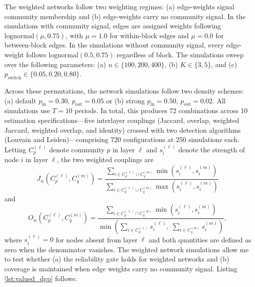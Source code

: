 \documentclass[11pt, letterpaper]{article}
\numberwithin{equation}{section}
\begin{document}
The weighted networks follow two weighting regimes: (a) edge-weights signal community membership and (b) edge-weights carry no community signal. In the simulations with community signal, edges are assigned weights following $\mathrm{lognormal}(\mu, 0.75)$, with $\mu = 1.0$ for within-block edges and $\mu = 0.0$ for between-block edges. In the simulations without community signal, every edge-weight follows $\mathrm{lognormal}(0.5, 0.75)$ regardless of block. The simulations sweep over the following parameters: (a) $n \in \{100, 200, 400\}$, (b) $K \in \{3, 5\}$, and (c) $p_{\mathrm{switch}} \in \{0.05, 0.20, 0.80\}$.

Across these permutations, the network simulations follow two density schemes: (a) default $p_{\mathrm{in}} = 0.30$, $p_{\mathrm{out}} = 0.05$ or (b) strong $p_{\mathrm{in}} = 0.50$, $p_{\mathrm{out}} = 0.02$. All simulations use $T = 10$ periods. In total, this produces 72 combinations across 10 estimation specifications---five interlayer couplings (Jaccard, overlap, weighted Jaccard, weighted overlap, and identity) crossed with two detection algorithms (Louvain and Leiden)---comprising 720 configurations at 250 simulations each. Letting $C_p^{(\ell)}$ denote community $p$ in layer $\ell$ and $s_i^{(\ell)}$ denote the strength of node $i$ in layer $\ell$, the two weighted couplings are
%
\begin{equation}
J_w\!\left(C_p^{(\ell)}, C_q^{(m)}\right) =
\frac{\sum_{i \in C_p^{(\ell)} \cup C_q^{(m)}} \min\!\left(s_i^{(\ell)}, s_i^{(m)}\right)}
     {\sum_{i \in C_p^{(\ell)} \cup C_q^{(m)}} \max\!\left(s_i^{(\ell)}, s_i^{(m)}\right)}
\label{eq:wjaccard}
\end{equation}
%
and
%
\begin{equation}
O_w\!\left(C_p^{(\ell)}, C_q^{(m)}\right) =
\frac{\sum_{i \in C_p^{(\ell)} \cap C_q^{(m)}} \min\!\left(s_i^{(\ell)}, s_i^{(m)}\right)}
     {\min\!\left(\sum_{i \in C_p^{(\ell)}} s_i^{(\ell)},\;
                  \sum_{i \in C_q^{(m)}} s_i^{(m)}\right)},
\label{eq:woverlap}
\end{equation}
%
where $s_i^{(\ell)} = 0$ for nodes absent from layer $\ell$ and both quantities are defined as zero when the denominator vanishes. The weighted network simulations allow me to test whether (a) the reliability gate holds for weighted networks and (b) coverage is maintained when edge weights carry no community signal. Listing \ref{lst:valued_dgp} follows:
\end{document}
